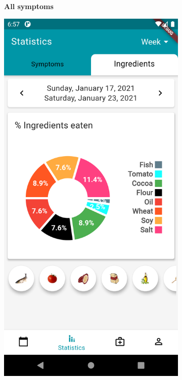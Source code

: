 \documentclass [12pt]{article}
\begin{document}
\begin{description}[leftmargin=1cm,rightmargin=1cm]
\begin{figure}[h!]
\begin{subfigure}[tl]{0.3\linewidth}
\caption{\textbf{All symptoms}}
\end{subfigure}\hfill
\begin{subfigure}[tr]{0.3\linewidth}
\includegraphics[width=\linewidth]{statistics2.PNG}

\end{subfigure}
\end{figure}
\end{description}
\end{document}
